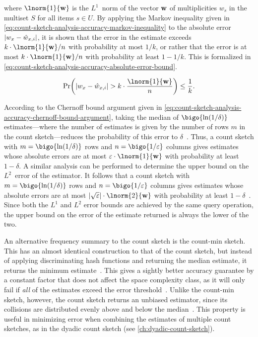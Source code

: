 where \( \lnorm{1}{\mathvector{w}} \) is the \( L^{1} \)~norm of the vector \( \mathbf{w} \) of multiplicities \( w_{s} \) in the multiset \( S \) for all items \( s \in U \).
By applying the Markov inequality given in \cref{eq:count-sketch-analysis-accuracy-markov-inequality} to the absolute error \( \lvert w_{x} - \hat{w}_{x, i}\rvert \), it is shown that the error in the estimate exceeds \( k \cdot \lnorm{1}{\mathvector{w}} / n \) with probability at most \( 1 / k \), or rather that the error is at most \( k \cdot \lnorm{1}{\mathvector{w}} / n \) with probability at least \( 1 - 1 / k \).
This is formalized in \cref{eq:count-sketch-analysis-accuracy-absolute-error-bound}.

\begin{equation}
  \label{eq:count-sketch-analysis-accuracy-absolute-error-bound}
  \probability \biggl( \absolute{w_{x} - \hat{w}_{x, i}} > k \cdot \frac{\lnorm{1}{\mathvector{w}}}{n} \biggr) \leq \frac{1}{k}.
\end{equation}

According to the Chernoff bound argument given in \cref{eq:count-sketch-analysis-accuracy-chernoff-bound-argument}, taking the median of \( \bigo{\ln (1 / \delta)} \) estimates---where the number of estimates is given by the number of rows \( m \) in the count sketch---reduces the probability of this error to \( \delta \)~\citep{cormode20}.
Thus, a count sketch with \( m = \bigo{\ln (1 / \delta)} \) rows and \( n = \bigo{1 / \varepsilon} \) columns gives estimates whose absolute errors are at most \( \varepsilon \cdot \lnorm{1}{\mathvector{w}} \) with probability at least \( 1 - \delta \).
A similar analysis can be performed to determine the upper bound on the \( L^{2} \)~error of the estimator.
It follows that a count sketch with \( m = \bigo{\ln (1 / \delta)} \) rows and \( n = \bigo{1 / \varepsilon} \) columns gives estimates whose absolute errors are at most \( \absolute{\sqrt{\varepsilon}} \cdot \lnorm{2}{\mathvector{w}} \) with probability at least \( 1 - \delta \)~\citep{cormode20}.
Since both the \( L^{1} \) and \( L^{2} \) error bounds are achieved by the same query operation, the upper bound on the error of the estimate returned is always the lower of the two.

An alternative frequency summary to the count sketch is the count-min sketch.
This has an almost identical construction to that of the count sketch, but instead of applying discriminating hash functions and returning the median estimate, it returns the minimum estimate~\citep{cormode05}.
This gives a sightly better accuracy guarantee by a constant factor that does not affect the space complexity class, as it will only fail if \emph{all} of the estimates exceed the error threshold~\citep{cormode20}.
Unlike the count-min sketch, however, the count sketch returns an unbiased estimator, since its collisions are distributed evenly above and below the median~\citep{charikar02}.
This property is useful in minimizing error when combining the estimates of multiple count sketches, as in the dyadic count sketch (see \cref{ch:dyadic-count-sketch}).

